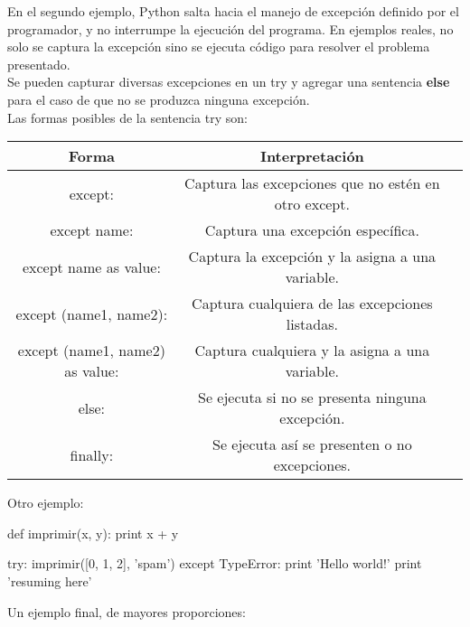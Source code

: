 En el segundo ejemplo, Python salta hacia el manejo de excepción definido por el programador, y no interrumpe la ejecución del programa. En ejemplos reales, no solo se captura la excepción sino se ejecuta código para resolver el problema presentado.\\

Se pueden capturar diversas excepciones en un try y agregar una sentencia \textbf{else} para el caso de que no se produzca ninguna excepción.\\

Las formas posibles de la sentencia try son:

\begin{table}[h]
\centering
\begin{tabular}{|c|c|c|} \hline
\textbf{Forma}	               &            \textbf{Interpretación}     \\ \hline
except:                        &            Captura las excepciones que no estén en otro except.\\ \hline
except name:                   &            Captura una excepción específica.\\ \hline
except name as value:          &            Captura la excepción y la asigna a una variable.\\ \hline
except (name1, name2):         &            Captura cualquiera de las excepciones listadas.\\ \hline
except (name1, name2) as value: &           Captura cualquiera y la asigna a una variable.\\ \hline
else:                          &            Se ejecuta si no se presenta ninguna excepción.\\ \hline
finally:                       &            Se ejecuta así se presenten o no excepciones.\\ \hline
\end{tabular}
\end{table}

Otro ejemplo:\\

\begin{pyglist} [language=python]
def imprimir(x, y):
    print x + y

try:
    imprimir([0, 1, 2], 'spam')
except TypeError: 
    print 'Hello world!'
    print 'resuming here'
\end{pyglist}

Un ejemplo final, de mayores proporciones:\\

